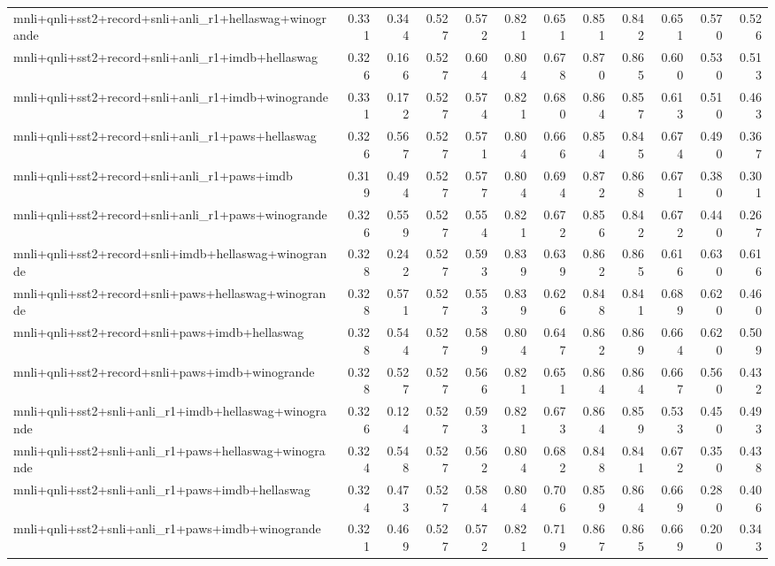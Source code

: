 \begin{table}[t]
\begin{tabular}{lrrrrrrrrrrr}
    mnli+qnli+sst2+record+snli+anli\_r1+hellaswag+winogrande & 0.331 & 0.344 & 0.527 & 0.572 & 0.821 & 0.651 & 0.851 & 0.842 & 0.651 & 0.570 & 0.526 \\
    mnli+qnli+sst2+record+snli+anli\_r1+imdb+hellaswag & 0.326 & 0.166 & 0.527 & 0.604 & 0.804 & 0.678 & 0.870 & 0.865 & 0.600 & 0.530 & 0.513 \\
    mnli+qnli+sst2+record+snli+anli\_r1+imdb+winogrande & 0.331 & 0.172 & 0.527 & 0.574 & 0.821 & 0.680 & 0.864 & 0.857 & 0.613 & 0.510 & 0.463 \\
    mnli+qnli+sst2+record+snli+anli\_r1+paws+hellaswag & 0.326 & 0.567 & 0.527 & 0.571 & 0.804 & 0.666 & 0.854 & 0.845 & 0.674 & 0.490 & 0.367 \\
    mnli+qnli+sst2+record+snli+anli\_r1+paws+imdb & 0.319 & 0.494 & 0.527 & 0.577 & 0.804 & 0.694 & 0.872 & 0.868 & 0.671 & 0.380 & 0.301 \\
    mnli+qnli+sst2+record+snli+anli\_r1+paws+winogrande & 0.326 & 0.559 & 0.527 & 0.554 & 0.821 & 0.672 & 0.856 & 0.842 & 0.672 & 0.440 & 0.267 \\
    mnli+qnli+sst2+record+snli+imdb+hellaswag+winogrande & 0.328 & 0.242 & 0.527 & 0.593 & 0.839 & 0.639 & 0.862 & 0.865 & 0.616 & 0.630 & 0.616 \\
    mnli+qnli+sst2+record+snli+paws+hellaswag+winogrande & 0.328 & 0.571 & 0.527 & 0.553 & 0.839 & 0.626 & 0.848 & 0.841 & 0.689 & 0.620 & 0.460 \\
    mnli+qnli+sst2+record+snli+paws+imdb+hellaswag & 0.328 & 0.544 & 0.527 & 0.589 & 0.804 & 0.647 & 0.862 & 0.869 & 0.664 & 0.620 & 0.509 \\
    mnli+qnli+sst2+record+snli+paws+imdb+winogrande & 0.328 & 0.527 & 0.527 & 0.566 & 0.821 & 0.651 & 0.864 & 0.864 & 0.667 & 0.560 & 0.432 \\
    mnli+qnli+sst2+snli+anli\_r1+imdb+hellaswag+winogrande & 0.326 & 0.124 & 0.527 & 0.593 & 0.821 & 0.673 & 0.864 & 0.859 & 0.533 & 0.450 & 0.493 \\
    mnli+qnli+sst2+snli+anli\_r1+paws+hellaswag+winogrande & 0.324 & 0.548 & 0.527 & 0.562 & 0.804 & 0.682 & 0.848 & 0.841 & 0.672 & 0.350 & 0.438 \\
    mnli+qnli+sst2+snli+anli\_r1+paws+imdb+hellaswag & 0.324 & 0.473 & 0.527 & 0.584 & 0.804 & 0.706 & 0.859 & 0.864 & 0.669 & 0.280 & 0.406 \\
    mnli+qnli+sst2+snli+anli\_r1+paws+imdb+winogrande & 0.321 & 0.469 & 0.527 & 0.572 & 0.821 & 0.719 & 0.867 & 0.865 & 0.669 & 0.200 & 0.343 \\

\end{tabular}
\end{table}
